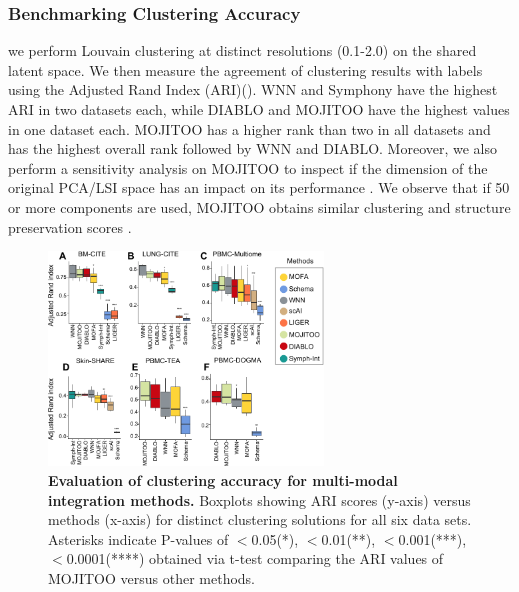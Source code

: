 \subsubsection{Benchmarking Clustering Accuracy}
we perform Louvain clustering at distinct resolutions (0.1-2.0) on the shared latent space. We then measure the agreement of clustering results with labels using the Adjusted Rand Index (ARI)(). WNN and Symphony have the highest ARI in two datasets each, while DIABLO and MOJITOO have the highest values in one dataset each. MOJITOO has a higher rank than two in all datasets and has the highest overall rank followed by WNN and DIABLO. Moreover, we also perform a sensitivity analysis on MOJITOO to inspect if the dimension of the original PCA/LSI space has an impact on its performance . We observe that if 50 or more components are used, MOJITOO obtains similar clustering and structure preservation scores .
\begin{figure}[!ht]
	\centering
	\includegraphics[width=0.65\textwidth]{ari/fig}
	\vspace{0.1cm}
	\caption[Evaluation of clustering accuracy for multi-modal integration methods.]{
	\textbf{Evaluation of clustering accuracy for multi-modal integration methods.} Boxplots showing ARI scores (y-axis) versus methods (x-axis) for distinct clustering solutions for all six data sets. Asterisks indicate P-values of $<$0.05(*), $<$0.01(**), $<$0.001(***), $<$0.0001(****) obtained via t-test comparing the ARI values of MOJITOO versus other methods. }
	\label{fig:ari}
\end{figure}

